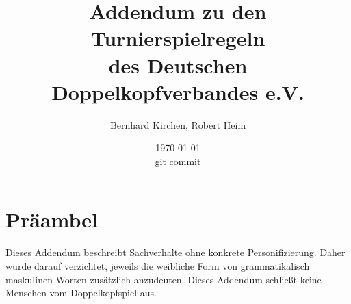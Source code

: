 \documentclass[twoside,12pt]{article}
\newcommand{\gitref}{}
\begin{document}
\title{Addendum zu den Turnierspielregeln\\des Deutschen Doppelkopfverbandes e.V.}
\author{Bernhard Kirchen, Robert Heim}
\date{\today\\[.35em]git commit \gitref}

\maketitle

\section*{Präambel}
Dieses Addendum beschreibt Sachverhalte ohne konkrete Personifizierung. Daher wurde
darauf verzichtet, jeweils die weibliche Form von grammatikalisch maskulinen Worten
zusätzlich anzudeuten. Dieses Addendum schließt keine Menschen vom Doppelkopfspiel
aus.


\end{document}
